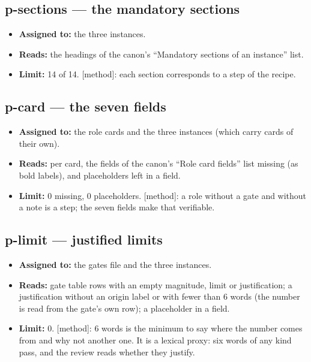 \documentclass[
  american,
  10pt,
]{report}
\providecommand{\tightlist}{%
  \setlength{\itemsep}{0pt}\setlength{\parskip}{0pt}}
\renewcommand{\texttt}[1]{{\ttfamily\hyphenchar\font=-1 #1}}
\begin{document}
\subsection{\texorpdfstring{\texttt{p-\allowbreak{}sections} --- the
mandatory
sections}{ --- the mandatory sections}}\label{p-sections-the-mandatory-sections}

\begin{itemize}
\tightlist
\item
  \textbf{Assigned to:} the three instances.
\item
  \textbf{Reads:} the headings of the canon's ``Mandatory sections of an
  instance'' list.
\item
  \textbf{Limit:} 14 of 14. \texttt{[method]}: each section corresponds
  to a step of the recipe.
\end{itemize}

\subsection{\texorpdfstring{\texttt{p-\allowbreak{}card} --- the seven
fields}{ --- the seven fields}}\label{p-card-the-seven-fields}

\begin{itemize}
\tightlist
\item
  \textbf{Assigned to:} the role cards and the three instances (which
  carry cards of their own).
\item
  \textbf{Reads:} per card, the fields of the canon's ``Role card
  fields'' list missing (as bold labels), and placeholders left in a
  field.
\item
  \textbf{Limit:} 0 missing, 0 placeholders. \texttt{[method]}: a role
  without a gate and without a note is a step; the seven fields make
  that verifiable.
\end{itemize}

\subsection{\texorpdfstring{\texttt{p-\allowbreak{}limit} --- justified
limits}{ --- justified limits}}\label{p-limit-justified-limits}

\begin{itemize}
\tightlist
\item
  \textbf{Assigned to:} the gates file and the three instances.
\item
  \textbf{Reads:} gate table rows with an empty magnitude, limit or
  justification; a justification without an origin label or with fewer
  than 6 words (the number is read from the gate's own row); a
  placeholder in a field.
\item
  \textbf{Limit:} 0. \texttt{[method]}: 6 words is the minimum to say
  where the number comes from and why not another one. It is a lexical
  proxy: six words of any kind pass, and the review reads whether they
  justify.
\end{itemize}
\end{document}
